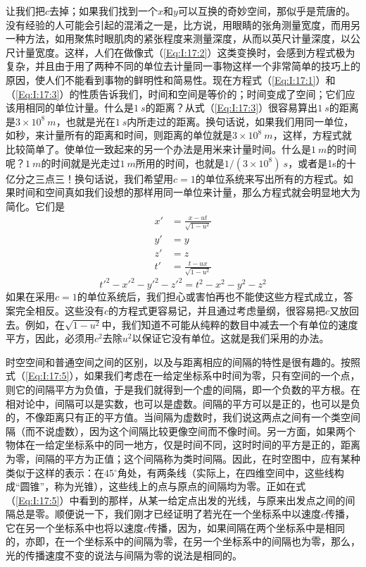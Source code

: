 让我们把$c$去掉；如果我们找到一个$x$和$y$可以互换的奇妙空间，那似乎是荒唐的。没有经验的人可能会引起的混淆之一是，比方说，用眼睛的张角测量宽度，而用另一种方法，如用聚焦时眼肌肉的紧张程度来测量深度，从而以英尺计量深度，以公尺计量宽度。这样，人们在做像式（\ref{Eq:I:17:2}）这类变换时，会感到方程式极为复杂，并且由于用了两种不同的单位去计量同一事物这样一个非常简单的技巧上的原因，使人们不能看到事物的鲜明性和简易性。现在方程式（\ref{Eq:I:17:1}）和（\ref{Eq:I:17:3}）的性质告诉我们，时间和空间是等价的；时间变成了空间；它们应该用相同的单位计量。什么是$1~s$的距离？从式（\ref{Eq:I:17:3}）很容易算出$1~s$的距离是$3 \times 10^8~m$，也就是光在$1~s$内所走过的距离。换句话说，如果我们用同一单位，如秒，来计量所有的距离和时间，则距离的单位就是$3 \times 10^8~m$，这样，方程式就比较简单了。使单位一致起来的另一个办法是用米来计量时间。什么是$1~m$的时间呢？$1~m$的时间就是光走过$1~m$所用的时间，也就是$1/(3\times10^{8})~s$，或者是1s的十亿分之三点三！换句话说，我们希望用$c=1$的单位系统来写出所有的方程式。如果时间和空间真如我们设想的那样用同一单位来计量，那么方程式就会明显地大为简化。它们是
\begin{equation}
    \label{Eq:I:17:4}
    \begin{aligned}
        x'&=\frac{x-ut}{\sqrt{1-u^2}} \\
        y'&=y \\
        z'&=z \\
        t'&=\frac{t-ux}{\sqrt{1-u^2}}
    \end{aligned}
\end{equation}
\begin{equation}
    \label{Eq:I:17:5}
    t'^2-x'^2-y'^2-z'^2=t^2-x^2-y^2-z^2
\end{equation}
如果在采用$c=1$的单位系统后，我们担心或害怕再也不能使这些方程式成立，答案完全相反。这些没有$c$的方程式更容易记，并且通过考虑量纲，很容易把$c$又放回去。例如，在$\sqrt{1-u^2}$中，我们知道不可能从纯粹的数目中减去一个有单位的速度平方，因此，必须用$c^2$去除$u^2$以保证它没有单位。这就是我们采用的办法。

时空空间和普通空间之间的区别，以及与距离相应的间隔的特性是很有趣的。按照式（\ref{Eq:I:17:5}），如果我们考虑在一给定坐标系中时间为零，只有空间的一个点，则它的间隔平方为负值，于是我们就得到一个虚的间隔，即一个负数的平方根。在相对论中，间隔可以是实数，也可以是虚数。间隔的平方可以是正的，也可以是负的，不像距离只有正的平方值。当间隔为虚数时，我们说这两点之间有一个类空间隔（而不说虚数），因为这个间隔比较更像空间而不像时间。另一方面，如果两个物体在一给定坐标系中的同一地方，仅是时间不同，这时时间的平方是正的，距离为零，间隔的平方为正值；这个间隔称为类时间隔。因此，在时空图中，应有某种类似于这样的表示：在45$^\circ$角处，有两条线（实际上，在四维空间中，这些线构成“圆锥”，称为光锥），这些线上的点与原点的间隔均为零。正如在式（\ref{Eq:I:17:5}）中看到的那样，从某一给定点出发的光线，与原来出发点之间的间隔总是零。顺便说一下，我们刚才已经证明了若光在一个坐标系中以速度$c$传播，它在另一个坐标系中也将以速度$c$传播，因为，如果间隔在两个坐标系中是相同的，亦即，在一个坐标系中的间隔为零，在另一个坐标系中的间隔也为零，那么，光的传播速度不变的说法与间隔为零的说法是相同的。

